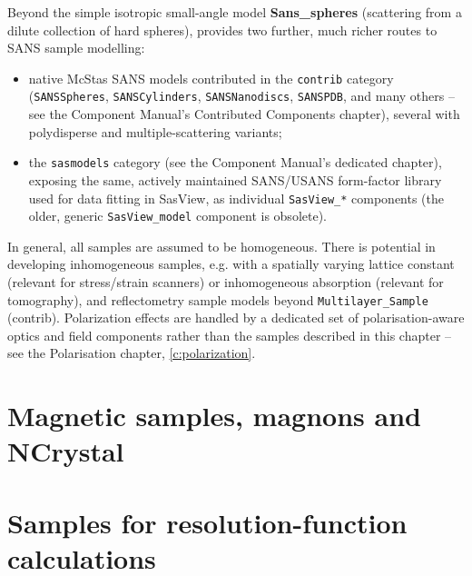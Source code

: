Beyond the simple isotropic small-angle model \textbf{Sans\_spheres}
(scattering from a dilute collection of hard spheres), \MCS provides two
further, much richer routes to SANS sample modelling:
\begin{itemize}
\item native McStas SANS models contributed in the \texttt{contrib}
  category (\texttt{SANSSpheres}, \texttt{SANSCylinders},
  \texttt{SANSNanodiscs}, \texttt{SANSPDB}, and many others -- see the
  Component Manual's Contributed Components chapter), several with
  polydisperse and multiple-scattering variants;
\item the \texttt{sasmodels} category (see the Component Manual's dedicated
  chapter), exposing the same, actively maintained SANS/USANS form-factor
  library used for data fitting in SasView, as individual
  \texttt{SasView\_*} components (the older, generic \texttt{SasView\_model}
  component is obsolete).
\end{itemize}
In general, all samples are assumed to be homogeneous. There is potential in
developing inhomogeneous samples, e.g. with a spatially varying lattice
constant (relevant for stress/strain scanners) or inhomogeneous absorption
(relevant for tomography), and reflectometry sample models beyond
\texttt{Multilayer\_Sample} (contrib). Polarization effects are handled by
a dedicated set of polarisation-aware optics and field components rather
than the samples described in this chapter -- see the Polarisation
chapter, \ref{c:polarization}.


         \newpage
        \newpage
          \newpage
   \newpage
             \newpage
           \newpage


\newpage
\section{Magnetic samples, magnons and NCrystal}




\newpage
\section{Samples for resolution-function calculations}



